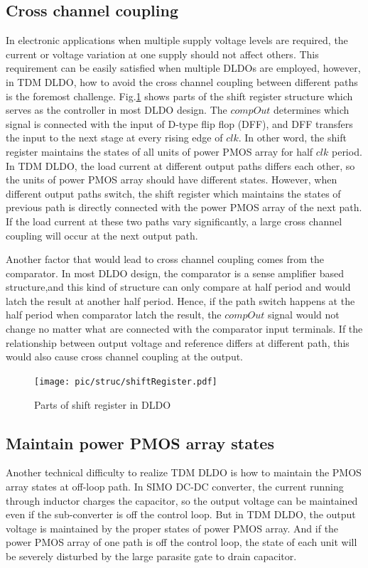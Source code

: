 \documentclass[journal]{IEEEtran}
\begin{document}
\subsection{Cross channel coupling}
In electronic applications when multiple supply voltage levels are required, the current or voltage variation at one supply should not affect others. This requirement can be easily satisfied when multiple DLDOs are employed, however, in TDM DLDO, how to avoid the cross channel coupling between different paths is the foremost challenge. Fig.\ref{fig:shift} shows parts of the shift register structure which serves as the controller in most DLDO design. The $compOut$ determines which signal is connected with the input of D-type flip flop (DFF), and DFF transfers the input to the next stage at every rising edge of $clk$. In other word, the shift register maintains the states of all units of power PMOS array for half $clk$ period. In TDM DLDO, the load current at different output paths differs each other, so the units of power PMOS array should have different states. However, when different output paths switch, the shift register which maintains the states of previous path is directly  connected with the power PMOS array of the next path. If the load current at these two paths vary significantly, a large cross channel coupling will occur at the next output path. 

Another factor that would lead to cross channel coupling comes from the comparator. In most DLDO design, the comparator is a sense amplifier based structure,and this kind of structure can only compare at half period and would latch the result at another half period. Hence, if the path switch happens at the half period when comparator latch the result, the $compOut$ signal would not change no matter what are connected with the comparator input terminals. If the relationship between output voltage and reference differs at different path, this would also cause cross channel coupling at the output.

\begin{figure}[t!]
    \centering
    \texttt{[image: pic/struc/shiftRegister.pdf]}
    \caption{Parts of shift register in DLDO}
    \label{fig:shift}
\end{figure}
\subsection{Maintain power PMOS array states}
Another technical difficulty to realize TDM DLDO is how to maintain the PMOS array states at off-loop path. In SIMO DC-DC converter, the current running through inductor charges the capacitor, so the output voltage can be maintained even if the sub-converter is off the control loop. But in TDM DLDO, the output voltage is maintained by the proper states of power PMOS array. And if the power PMOS array of one path is off the control loop, the state of each unit will be severely disturbed by the large parasite gate to drain capacitor.
\end{document}
